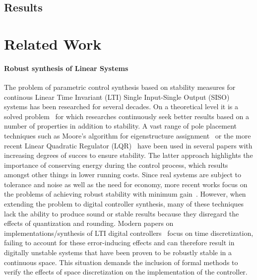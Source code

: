 \documentclass{sig-alternate-05-2015}
\begin{document}
\subsection{Results}
\label{experimental-results}

\section{Related Work}

\paragraph{Robust synthesis of Linear Systems} 

The problem of parametric control synthesis based on stability measures for
continous Linear Time Invariant (LTI) Single Input-Single Output (SISO)
systems has been researched for several decades.  On a theoretical level it
is a solved problem~\cite{wonham1967pole} for which researches continuously
seek better results based on a number of properties in addition to
stability.  A vast range of pole placement techniques such as Moore's
algorithm for eigenstructure assignment~\cite{klein1977eigenvalue} or the
more recent Linear Quadratic Regulator (LQR)~\cite{bemporad2002explicit}
have been used in several papers with increasing degrees of succes to ensure
stability.  The latter approach highlights the importance of conserving
energy during the control process, which results amongst other things in
lower running costs.  Since real systems are subject to tolerance and noise
as well as the need for economy, more recent works focus on the problems of
achieving robust stability with minimum
gain~\cite{schmid2014unified,konigorski2012pole}.  However, when extending
the problem to digital controller synthesis, many of these techniques lack
the ability to produce sound or stable results because they disregard the
effects of quantization and rounding.  Modern papers on
implementations/synthesis of LTI digital
controllers~\cite{das2013lqr,ghosh2013fpga} focus on time discretization,
failing to account for these error-inducing effects and can therefore result
in digitally unstable systems that have been proven to be robustly stable in
a continuous space.  This situation demands the inclusion of formal methods
to verify the effects of space discretization on the implementation of the
controller.
\end{document}
